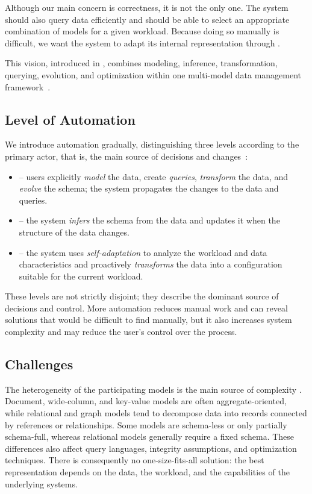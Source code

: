 Although our main concern is correctness, it is not the only one. The system should also query data efficiently and should be able to select an appropriate combination of models for a given workload. Because doing so manually is difficult, we want the system to adapt its internal representation through .

This vision, introduced in , combines modeling, inference, transformation, querying, evolution, and optimization within one multi-model data management framework~\citep{ideas2022vision, Jiaheng2023Survey}.

\subsection{Level of Automation}

We introduce automation gradually, distinguishing three levels according to the primary actor, that is, the main source of decisions and changes~\citep{ideas2022vision}:
\begin{itemize}
    \item {} -- users explicitly \emph{model} the data, create \emph{queries}, \emph{transform} the data, and \emph{evolve} the schema; the system propagates the changes to the data and queries.
    \item {} -- the system \emph{infers} the schema from the data and updates it when the structure of the data changes.
    \item {} -- the system uses \emph{self-adaptation} to analyze the workload and data characteristics and proactively \emph{transforms} the data into a configuration suitable for the current workload.
\end{itemize}
These levels are not strictly disjoint; they describe the dominant source of decisions and control. More automation reduces manual work and can reveal solutions that would be difficult to find manually, but it also increases system complexity and may reduce the user's control over the process.

\subsection{Challenges}

The heterogeneity of the participating models is the main source of complexity \citep{Jiaheng2023Survey}. Document, wide-column, and key-value models are often aggregate-oriented, while relational and graph models tend to decompose data into records connected by references or relationships. Some models are schema-less or only partially schema-full, whereas relational models generally require a fixed schema. These differences also affect query languages, integrity assumptions, and optimization techniques. There is consequently no one-size-fits-all solution: the best representation depends on the data, the workload, and the capabilities of the underlying systems.

